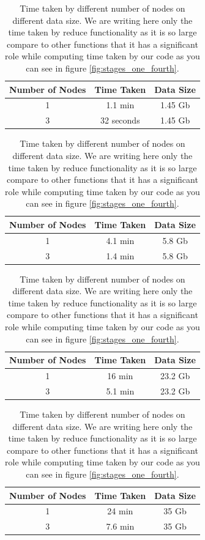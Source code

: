\begin{table}[]
    \centering
    \begin{tabular}{|c|c|c|}
\hline
Number of Nodes  & Time Taken & Data Size \\ \hline
        1 & 1.1 min & 1.45 Gb \\ \hline
        3 & 32 seconds & 1.45 Gb \\
\hline
\end{tabular}
\quad
\begin{tabular}{|c|c|c|}
\hline
Number of Nodes  & Time Taken & Data Size \\ \hline
        1 & 4.1 min & 5.8 Gb \\ \hline
        3 & 1.4 min & 5.8 Gb \\
\hline
\end{tabular}
\begin{tabular}{|c|c|c|}
\hline
Number of Nodes  & Time Taken & Data Size \\ \hline
        1 & 16 min & 23.2 Gb \\ \hline
        3 & 5.1 min & 23.2 Gb \\
\hline
\end{tabular}
\quad
\begin{tabular}{|c|c|c|}
\hline
Number of Nodes  & Time Taken & Data Size \\ \hline
        1 & 24 min & 35 Gb \\ \hline
        3 & 7.6 min & 35 Gb \\
\hline
\end{tabular}
    \caption{Time taken by different number of nodes on different data size. We are writing here only the time taken by reduce functionality as it is so large compare to other functions that it has a significant role while computing time taken by our code as you can see in figure \ref{fig:stages_one_fourth}.}
    \label{table_time}
\end{table}






